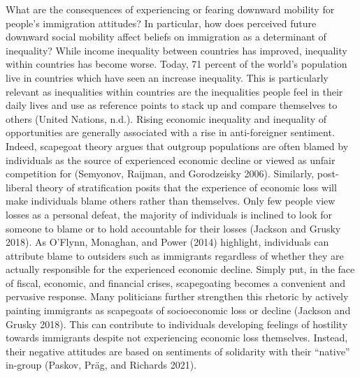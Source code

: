 \documentclass[
  11pt,
]{article}
\begin{document}
What are the consequences of experiencing or fearing downward mobility
for people's immigration attitudes? In particular, how does perceived
future downward social mobility affect beliefs on immigration as a
determinant of inequality? While income inequality between countries has
improved, inequality within countries has become worse. Today, 71
percent of the world's population live in countries which have seen an
increase inequality. This is particularly relevant as inequalities
within countries are the inequalities people feel in their daily lives
and use as reference points to stack up and compare themselves to others
(United Nations, n.d.). Rising economic inequality and inequality of
opportunities are generally associated with a rise in anti-foreigner
sentiment. Indeed, scapegoat theory argues that outgroup populations are
often blamed by individuals as the source of experienced economic
decline or viewed as unfair competition for (Semyonov, Raijman, and
Gorodzeisky 2006). Similarly, post-liberal theory of stratification
posits that the experience of economic loss will make individuals blame
others rather than themselves. Only few people view losses as a personal
defeat, the majority of individuals is inclined to look for someone to
blame or to hold accountable for their losses (Jackson and Grusky 2018).
As O'Flynn, Monaghan, and Power (2014) highlight, individuals can
attribute blame to outsiders such as immigrants regardless of whether
they are actually responsible for the experienced economic decline.
Simply put, in the face of fiscal, economic, and financial crises,
scapegoating becomes a convenient and pervasive response. Many
politicians further strengthen this rhetoric by actively painting
immigrants as scapegoats of socioeconomic loss or decline (Jackson and
Grusky 2018). This can contribute to individuals developing feelings of
hostility towards immigrants despite not experiencing economic loss
themselves. Instead, their negative attitudes are based on sentiments of
solidarity with their ``native'' in-group (Paskov, Präg, and Richards
2021).
\end{document}
